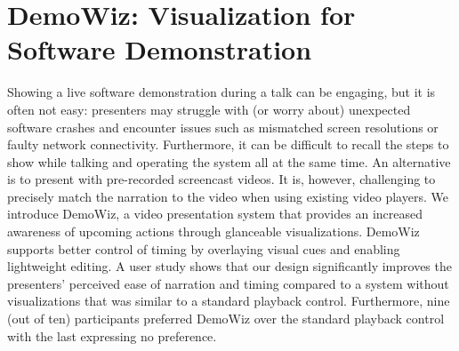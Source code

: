 \chapter{DemoWiz: Visualization for Software Demonstration}

Showing a live software demonstration during a talk can be engaging, but it is often not easy: presenters may struggle with (or worry about) unexpected software crashes and encounter issues such as mismatched screen resolutions or faulty network connectivity. Furthermore, it can be difficult to recall the steps to show while talking and operating the system all at the same time. An alternative is to present with pre-recorded screencast videos. It is, however, challenging to precisely match the narration to the video when using existing video players. We introduce DemoWiz, a video presentation system that provides an increased awareness of upcoming actions through glanceable visualizations. DemoWiz supports better control of timing by overlaying visual cues and enabling lightweight editing. A user study shows that our design significantly improves the presenters’ perceived ease of narration and timing compared to a system without visualizations that was similar to a standard playback control. Furthermore, nine (out of ten) participants preferred DemoWiz over the standard playback control with the last expressing no preference.









